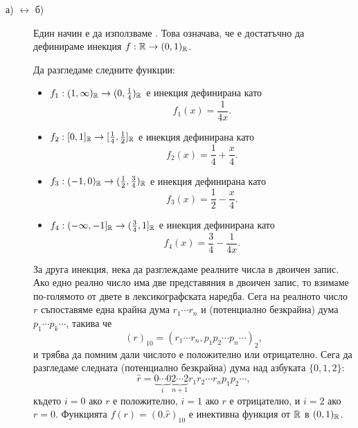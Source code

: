 \begin{hint}
  \begin{description}
  \item[а) $\leftrightarrow$ б)]
    Един начин е да използваме . Това означава, че е достатъчно да дефинираме инекция $f:\mathbb{R} \to (0,1)_{\mathbb{R}}$.

    Да разгледаме следните функции:
    \begin{itemize}
    \item 
      $f_1: (1,\infty)_{\mathbb{R}} \to (0,\frac{1}{4})_{\mathbb{R}}$ е инекция дефинирана като
      \[f_1(x) = \frac{1}{4x}.\]
    \item
      $f_2: [0,1]_{\mathbb{R}} \to [\frac{1}{4},\frac{1}{2}]_{\mathbb{R}}$ е инекция дефинирана като
      \[f_2(x) = \frac{1}{4} + \frac{x}{4}.\]
    \item
      $f_3: (-1,0)_{\mathbb{R}} \to (\frac{1}{2},\frac{3}{4})_{\mathbb{R}}$ е инекция дефинирана като
      \[f_3(x) = \frac{1}{2} - \frac{x}{4}.\]
    \item
      $f_4: (-\infty,-1]_{\mathbb{R}} \to (\frac{3}{4},1]_{\mathbb{R}}$ е инекция дефинирана като
      \[f_4(x) = \frac{3}{4} - \frac{1}{4x}.\]
    \end{itemize}

    За друга инекция, нека да разглеждаме реалните числа в двоичен запис.
    Ако едно реално число има две представяния в двоичен запис, то взимаме по-голямото от двете в лексикографската наредба.
    Сега на реалното число $r$ съпоставяме една крайна дума $r_1\cdots r_n$ и (потенциално безкрайна) дума $p_1\cdots p_k\cdots$, такива че
    \[(r)_{10} = (r_1\cdots r_n,p_1p_2\cdots p_n \cdots)_2,\]
    и трябва да помним дали числото е положително или отрицателно.
    Сега да разгледаме следната (потенциално безкрайна) дума над азбуката $\{0,1,2\}$:
    \[\hat{r} = \underbrace{0\cdots 0}_{i}\underbrace{2\cdots 2}_{n+1}r_1r_2\cdots r_n p_1p_2\cdots, \]
    където $i = 0$ ако $r$ е положително, $i = 1$ ако $r$ е отрицателно, и $i = 2$ ако $r = 0$.
    Функцията $f(r) = (0.\hat{r})_{10}$ е инективна функция от $\mathbb{R}$ в $(0,1)_{\mathbb{R}}$.
    

\end{description}
\end{hint}
